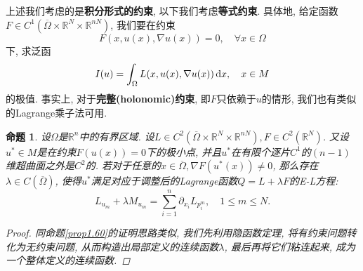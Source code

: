 \documentclass[12pt,a4paper]{article}
\newtheorem{proposition}[theorem]{命题}
\begin{document}
上述我们考虑的是\textbf{积分形式的约束}, 以下我们考虑\textbf{等式约束}. 具体地, 给定函数$F \in C^1(\overline{\Omega} \times \mathbb{R}^N \times \mathbb{R}^{nN})$, 我们要在约束 
\begin{equation*}
    F(x, u(x), \nabla u(x)) = 0, \quad \forall x \in \Omega
\end{equation*}
下, 求泛函 
\begin{equation*}
    I(u) = \int_{\Omega} L(x, u(x), \nabla u(x)) \,{\rm d}x, \quad x \in M 
\end{equation*}
的极值. 事实上, 对于\textbf{完整(holonomic)约束}, 即$F$只依赖于$u$的情形, 我们也有类似的Lagrange乘子法可用.

\begin{proposition}\label{prop1.62}
    设$\Omega$是$\mathbb{R}^n$中的有界区域. 设$L \in C^2(\overline{\Omega} \times \mathbb{R}^N \times \mathbb{R}^{nN}), F \in C^2(\mathbb{R}^N)$.
    又设$u^* \in M$是在约束$F(u(x)) = 0$下的极小点, 并且$u^*$在有限个逐片$C^1$的$(n - 1)$维超曲面之外是$C^2$的.
    若对于任意的$x \in \overline{\Omega}, \nabla F(u^*(x)) \neq 0$, 那么存在$\lambda \in C(\overline{\Omega})$, 使得$u^*$满足对应于调整后的Lagrange函数$Q = L + \lambda F$的E-L方程:
    \begin{equation}\label{20}
        \boxed{L_{u_m} + \lambda M_{u_m} = \sum_{i = 1}^n\partial_{x_i}L_{p_i^m}, \quad 1 \leq m \leq N.}
    \end{equation}
    \begin{proof}
        同命题\ref{prop1.60}的证明思路类似, 我们先利用隐函数定理, 将有约束问题转化为无约束问题, 从而构造出局部定义的连续函数$\lambda$, 最后再将它们粘连起来, 成为一个整体定义的连续函数.


\end{proof}
\end{proposition}
\end{document}
